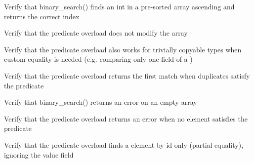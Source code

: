 \begin{DoxyRefList}
%
Verify that binary\+\_\+search() finds an int in a pre-\/sorted array ascending and returns the correct index  
\item[Global \doxylink{test__array_8cpp_a07d0aa98c290781fa1b3a01962df6017}{TEST\+\_\+F} (\doxylink{classArrayInitTest}{Array\+Init\+Test}, Contains\+Predicate\+Does\+Not\+Modify\+Array)]\label{test__test000183}%
%
Verify that the predicate overload does not modify the array  
\item[Global \doxylink{test__array_8cpp_af9e4cf9ea40ca0249add030c97e80deb}{TEST\+\_\+F} (\doxylink{classArrayInitTest}{Array\+Init\+Test}, Contains\+Predicate\+Works\+For\+Trivial\+Type\+With\+Custom\+Equality)]\label{test__test000182}%
%
Verify that the predicate overload also works for trivially copyable types when custom equality is needed (e.\+g. comparing only one field of a )  
\item[Global \doxylink{test__array_8cpp_a25cfc243b120707a4d61db248da62d6f}{TEST\+\_\+F} (\doxylink{classArrayInitTest}{Array\+Init\+Test}, Contains\+Predicate\+Returns\+First\+Match)]\label{test__test000180}%
%
Verify that the predicate overload returns the first match when duplicates satisfy the predicate  
\item[Global \doxylink{test__array_8cpp_aaea064afd5eabd180e3ace0403e359f1}{TEST\+\_\+F} (\doxylink{classArrayInitTest}{Array\+Init\+Test}, Binary\+Search\+Int\+Empty\+Array\+Returns\+Error)]\label{test__test000189}%
%
Verify that binary\+\_\+search() returns an error on an empty array  
\item[Global \doxylink{test__array_8cpp_a3a27237aa83a87ef470094561f31eeab}{TEST\+\_\+F} (\doxylink{classArrayInitTest}{Array\+Init\+Test}, Contains\+Predicate\+Non\+Trivial\+Not\+Found\+Returns\+Error)]\label{test__test000178}%
%
Verify that the predicate overload returns an error when no element satisfies the predicate  
\item[Global \doxylink{test__array_8cpp_a704ddfb828075d916727e41d81c4744d}{TEST\+\_\+F} (\doxylink{classArrayInitTest}{Array\+Init\+Test}, Contains\+Predicate\+Non\+Trivial\+Finds\+By\+Id\+Only)]\label{test__test000177}%
%
Verify that the predicate overload finds a  element by id only (partial equality), ignoring the value field  
\item[Global \doxylink{test__array_8cpp_abbfca33b139559a4891806f949c68850}{TEST\+\_\+F} (\doxylink{classArrayInitTest}{Array\+Init\+Test}, Contains\+Predicate\+Non\+Trivial\+Finds\+Element)]\label{test__test000176}%

\end{DoxyRefList}
